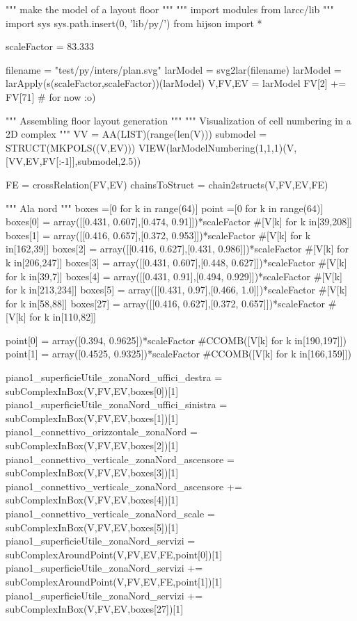 """ make the model of a layout floor """
""" import modules from larcc/lib """
import sys
sys.path.insert(0, 'lib/py/')
from hijson import *

scaleFactor = 83.333

filename = "test/py/inters/plan.svg"
larModel = svg2lar(filename)
larModel = larApply(s(scaleFactor,scaleFactor))(larModel)
V,FV,EV = larModel
FV[2] += FV[71]      # for now :o)

""" Assembling floor layout generation """
""" Visualization of cell numbering in a 2D complex """
VV = AA(LIST)(range(len(V)))
submodel = STRUCT(MKPOLS((V,EV)))
VIEW(larModelNumbering(1,1,1)(V,[VV,EV,FV[:-1]],submodel,2.5))

FE = crossRelation(FV,EV)
chainsToStruct = chain2structs(V,FV,EV,FE)

""" Ala nord """
boxes =[0 for k in range(64)]
point =[0 for k in range(64)]
boxes[0] = array([[0.431, 0.607],[0.474, 0.91]])*scaleFactor #[V[k] for k in[39,208]]
boxes[1] = array([[0.416, 0.657],[0.372, 0.953]])*scaleFactor #[V[k] for k in[162,39]]
boxes[2] = array([[0.416, 0.627],[0.431, 0.986]])*scaleFactor #[V[k] for k in[206,247]]
boxes[3] = array([[0.431, 0.607],[0.448, 0.627]])*scaleFactor #[V[k] for k in[39,7]]
boxes[4] = array([[0.431, 0.91],[0.494, 0.929]])*scaleFactor  #[V[k] for k in[213,234]]
boxes[5] = array([[0.431, 0.97],[0.466, 1.0]])*scaleFactor #[V[k] for k in[58,88]]
boxes[27] = array([[0.416, 0.627],[0.372, 0.657]])*scaleFactor #[V[k] for k in[110,82]]

point[0] = array([0.394, 0.9625])*scaleFactor #CCOMB([V[k] for k in[190,197]])
point[1] = array([0.4525, 0.9325])*scaleFactor #CCOMB([V[k] for k in[166,159]])

piano1_superficieUtile_zonaNord_uffici_destra = subComplexInBox(V,FV,EV,boxes[0])[1]
piano1_superficieUtile_zonaNord_uffici_sinistra = subComplexInBox(V,FV,EV,boxes[1])[1]
piano1_connettivo_orizzontale_zonaNord = subComplexInBox(V,FV,EV,boxes[2])[1]
piano1_connettivo_verticale_zonaNord_ascensore = subComplexInBox(V,FV,EV,boxes[3])[1]
piano1_connettivo_verticale_zonaNord_ascensore += subComplexInBox(V,FV,EV,boxes[4])[1]
piano1_connettivo_verticale_zonaNord_scale = subComplexInBox(V,FV,EV,boxes[5])[1]
piano1_superficieUtile_zonaNord_servizi = subComplexAroundPoint(V,FV,EV,FE,point[0])[1]
piano1_superficieUtile_zonaNord_servizi += subComplexAroundPoint(V,FV,EV,FE,point[1])[1]
piano1_superficieUtile_zonaNord_servizi += subComplexInBox(V,FV,EV,boxes[27])[1]


